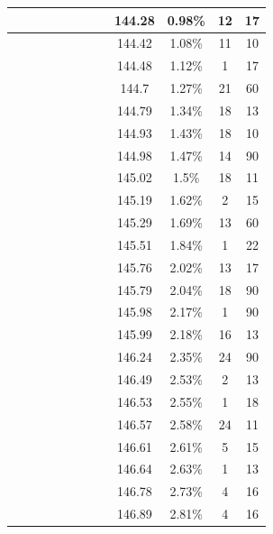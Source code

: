 \begin{center}
\begin{longtable}{|c|c|c|c|c|c|c|c|c|c|c|c|}
 \x &  &  &  &  &  &  &  \x & 144.28 & 0.98\% & 12 & 17 \\ \hline
 \x &  &  \x &  &  \x &  \x &  &  & 144.42 & 1.08\% & 11 & 10 \\ \hline
 \x &  \x &  &  \x &  \x &  \x &  &  \x & 144.48 & 1.12\% & 1 & 17 \\ \hline
 \x &  &  \x &  \x &  &  \x &  &  & 144.7 & 1.27\% & 21 & 60 \\ \hline
 \x &  \x &  \x &  \x &  &  \x &  &  & 144.79 & 1.34\% & 18 & 13 \\ \hline
 \x &  &  &  &  &  \x &  &  & 144.93 & 1.43\% & 18 & 10 \\ \hline
 \x &  &  \x &  \x &  \x &  \x &  \x &  & 144.98 & 1.47\% & 14 & 90 \\ \hline
 \x &  &  \x &  \x &  &  \x &  \x &  & 145.02 & 1.5\% & 18 & 11 \\ \hline
 \x &  \x &  \x &  \x &  &  \x &  \x &  \x & 145.19 & 1.62\% & 2 & 15 \\ \hline
 \x &  &  &  \x &  &  \x &  \x &  & 145.29 & 1.69\% & 13 & 60 \\ \hline
 \x &  \x &  &  &  &  &  &  \x & 145.51 & 1.84\% & 1 & 22 \\ \hline
 \x &  &  \x &  &  \x &  \x &  &  \x & 145.76 & 2.02\% & 13 & 17 \\ \hline
 \x &  \x &  \x &  &  \x &  &  &  \x & 145.79 & 2.04\% & 18 & 90 \\ \hline
 \x &  \x &  \x &  &  \x &  \x &  \x &  & 145.98 & 2.17\% & 1 & 90 \\ \hline
 \x &  &  \x &  &  &  &  &  & 145.99 & 2.18\% & 16 & 13 \\ \hline
 \x &  &  &  &  \x &  &  &  & 146.24 & 2.35\% & 24 & 90 \\ \hline
 \x &  \x &  \x &  &  \x &  \x &  &  & 146.49 & 2.53\% & 2 & 13 \\ \hline
 \x &  &  \x &  &  &  \x &  &  \x & 146.53 & 2.55\% & 1 & 18 \\ \hline
 \x &  \x &  \x &  &  &  &  &  & 146.57 & 2.58\% & 24 & 11 \\ \hline
 \x &  \x &  \x &  &  \x &  \x &  \x &  \x & 146.61 & 2.61\% & 5 & 15 \\ \hline
 \x &  \x &  &  \x &  \x &  \x &  \x &  & 146.64 & 2.63\% & 1 & 13 \\ \hline
 \x &  \x &  \x &  \x &  \x &  \x &  \x &  \x & 146.78 & 2.73\% & 4 & 16 \\ \hline
 \x &  \x &  \x &  \x &  \x &  \x &  \x &  & 146.89 & 2.81\% & 4 & 16 \\ \hline

\end{longtable}
\end{center}
